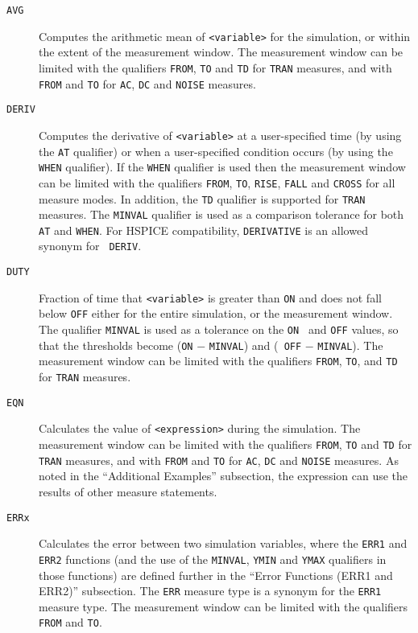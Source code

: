 \begin{Command}
\begin{Arguments}
\begin{description}
  \item[\tt AVG] Computes the arithmetic mean of {\tt <variable>} for
    the simulation, or within the extent of the measurement window.
    The measurement window can be limited with the qualifiers {\tt FROM},
    {\tt TO} and {\tt TD} for {\tt TRAN} measures, and with {\tt FROM}
    and {\tt TO} for {\tt AC}, {\tt DC} and {\tt NOISE} measures.

  \item[\tt DERIV] Computes the derivative of {\tt <variable>} at a
    user-specified time (by using the {\tt AT} qualifier) or when a
    user-specified condition occurs (by using the {\tt WHEN}
    qualifier). If the {\tt WHEN} qualifier is used then the
    measurement window can be limited with the qualifiers {\tt FROM},
    {\tt TO}, {\tt RISE}, {\tt FALL} and {\tt CROSS} for all measure
    modes.  In addition, the {\tt TD} qualifier is supported for
    {\tt TRAN} measures. The {\tt MINVAL} qualifier is used as a
    comparison tolerance for both {\tt AT} and {\tt WHEN}.  For HSPICE
    compatibility, {\tt DERIVATIVE} is an allowed synonym for {\tt
    DERIV}.

  \item[\tt DUTY] Fraction of time that {\tt <variable>} is greater than
   {\tt ON} and does not fall below {\tt OFF} either for the entire
    simulation, or the measurement window. The qualifier {\tt MINVAL}
    is used as a tolerance on the {\tt ON } and {\tt OFF} values, so
    that the thresholds become ({\tt ON} $-$ {\tt MINVAL}) and ({\tt
    OFF} $-$ {\tt MINVAL}).  The measurement window can be limited
    with the qualifiers {\tt FROM}, {\tt TO}, and {\tt TD} for
   {\tt TRAN} measures.

\item[\tt EQN] Calculates the value of {\tt <expression>} during the simulation.
    The measurement window can be limited with the qualifiers {\tt FROM},
    {\tt TO} and {\tt TD} for {\tt TRAN} measures, and with {\tt FROM}
    and {\tt TO} for {\tt AC}, {\tt DC} and {\tt NOISE} measures.  As noted in the
    ``Additional Examples'' subsection, the expression can use the
    results of other measure statements.

\item[\tt ERRx] Calculates the error between two simulation variables, where
    the {\tt ERR1} and {\tt ERR2} functions (and the use of the {\tt MINVAL},
    {\tt YMIN} and {\tt YMAX} qualifiers in those functions) are defined further
    in the ``Error Functions (ERR1 and ERR2)'' subsection.  The {\tt ERR} measure
    type is a synonym for  the {\tt ERR1} measure type.  The measurement
    window can be limited  with the qualifiers {\tt FROM} and {\tt TO}.


\end{description}
\end{Arguments}
\end{Command}
